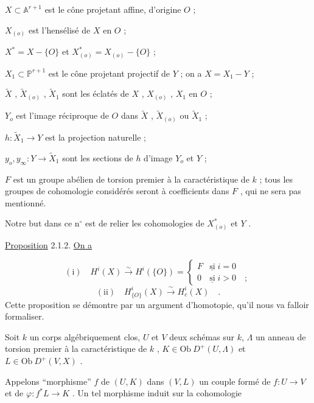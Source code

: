 $X \subset \mathbb{A}^{r+1}$ est le cône projetant affine, d'origine $O$ ;

$X_{(o)}$ est l'hensélisé de $X$ en $O$ ;

$X^* = X - \{O\}$ et $X^*_{(o)} = X_{(o)} - \{O\}$ ;

$X_1 \subset \mathbb{P}^{r+1}$ est le cône projetant projectif de $Y$ ; on a $X = X_1 - Y$ ;

$\widetilde{X}$ , $\widetilde{X}_{(o)}$ , $\widetilde{X}_1$ sont les éclatés de $X$ , $X_{(o)}$ , $X_1$ en $O$ ;

$Y_o$ est l'image réciproque de $O$ dans $\widetilde{X}$ , $\widetilde{X}_{(o)}$ ou $\widetilde{X}_1$ ;

$h : \widetilde{X}_1 \to Y$ est la projection naturelle ;

$y_o , y_\infty : Y \to \widetilde{X}_1$ sont les sections de $h$ d'image $Y_o$ et $Y$ ;

$F$ est un groupe abélien de torsion premier à la caractéristique de $k$ ; tous les groupes de cohomologie considérés seront à coefficients dans $F$ , qui ne sera pas mentionné.

Notre but dans ce n$^{\circ}$ est de relier les cohomologies de $X^*_{(o)}$ et $Y$ .

\underline{Proposition} 2.1.2. \underline{On a}

\begin{equation*}
\mathrm{(i)} \quad H^i(X) \stackrel{\sim}{\longrightarrow} H^i(\{O\}) = \left\{ \begin{array}{ll} F & \underline{\mathrm{si}} \; i = 0 \\[1.5ex] 0 & \underline{\mathrm{si}} \; i > 0 \quad ; \end{array} \right.
\end{equation*}
\begin{equation*}
\mathrm{(ii)} \quad H^i_{\{O\}}(X) \stackrel{\sim}{\longrightarrow} H^i_c(X) \quad .
\end{equation*}
Cette proposition se démontre par un argument d'homotopie, qu'il nous va falloir formaliser.

Soit $k$ un corps algébriquement clos, $U$ et $V$ deux schémas sur $k$, $\Lambda$ un anneau de torsion premier à la caractéristique de $k$ , $K \in \mathrm{Ob}\ D^+(U,\Lambda)$ et $L \in \mathrm{Ob}\ D^+(V,X)$ .



Appelons ``morphisme'' $f$ de $(U,K)$ dans $(V,L)$ un couple formé de $f : U \to V$ et de $\varphi : f^*L \to K$ . Un tel morphisme induit sur la cohomologie

